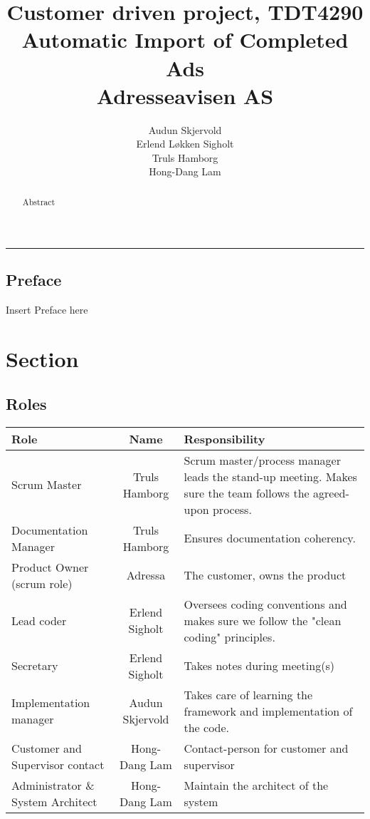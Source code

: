 \documentclass[12pt, a4paper]{article}
\title{\normalsize Customer driven project, TDT4290 \\ \LARGE \textbf{Automatic Import of Completed Ads} \normalsize \\Adresseavisen AS}
\author{Audun Skjervold \\ Erlend Løkken Sigholt \\ Truls Hamborg \\ Hong-Dang Lam}
\begin{document}
\maketitle
\newpage
\begin{abstract}
 
Abstract
 
\end{abstract}
 
\newpage
\hrule
\subsection*{Preface}
Insert Preface here
\newpage
\tableofcontents
\newpage
 
\section{Section}
\subsection{Roles}
\begin{center}
  \begin{tabular}{| l  c  b{5cm}|}
    \hline
    Role & Name & Responsibility \\ \hline 
    Scrum Master & Truls Hamborg &  Scrum master/process manager leads the stand-up meeting. Makes sure the team follows the agreed-upon process. \\ \hline
    Documentation Manager & Truls Hamborg &  Ensures documentation coherency. \\ \hline
    Product Owner (scrum role) & Adressa & The customer, owns the product\\ \hline
    Lead coder & Erlend Sigholt & Oversees coding conventions and makes sure we follow the "clean coding" principles. \\ \hline
    Secretary & Erlend Sigholt & Takes notes during meeting(s) \\ \hline
    Implementation manager & Audun Skjervold & Takes care of learning the framework and implementation of the code.\\ \hline
    Customer and Supervisor contact & Hong-Dang Lam & Contact-person for customer and supervisor \\ \hline
    Administrator \& System Architect & Hong-Dang Lam & Maintain the architect of the system \\
    \hline
  \end{tabular}
\end{center}
\end{document}
